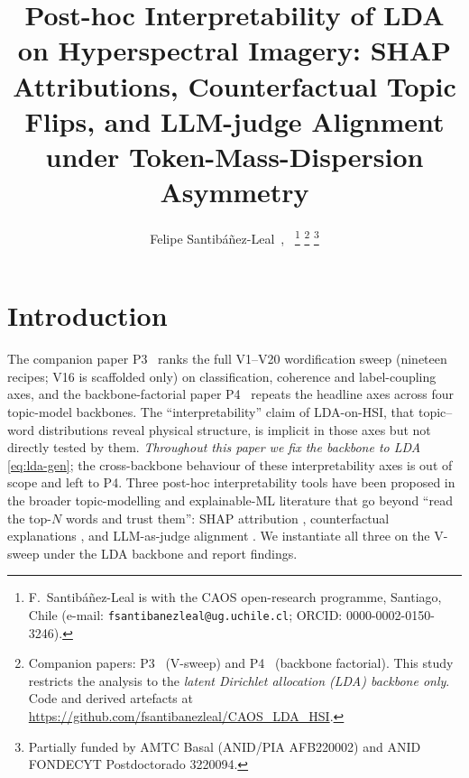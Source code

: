 \documentclass[journal,a4paper,10pt]{IEEEtran}
\title{Post-hoc Interpretability of LDA on Hyperspectral Imagery:
SHAP Attributions, Counterfactual Topic Flips, and LLM-judge
Alignment under Token-Mass-Dispersion Asymmetry}
\author{%
  Felipe Santib\'a\~nez-Leal~\orcidlink{0000-0002-0150-3246},~\IEEEmembership{Independent Researcher}%
  \thanks{F.\ Santib\'a\~nez-Leal is with the CAOS open-research
    programme, Santiago, Chile
    (e-mail: \texttt{fsantibanezleal@ug.uchile.cl};
    ORCID: 0000-0002-0150-3246).}%
  \thanks{Companion papers: P3~\cite{santibanezleal2026sweep}
    (V-sweep) and P4~\cite{santibanezleal2026factorial} (backbone
    factorial). This study restricts the analysis to the
    \emph{latent Dirichlet allocation (LDA) backbone only}. Code and
    derived artefacts at
    \url{https://github.com/fsantibanezleal/CAOS_LDA_HSI}.}%
  \thanks{Partially funded by AMTC Basal (ANID/PIA AFB220002) and
    ANID FONDECYT Postdoctorado 3220094.}%
}
\begin{document}

\maketitle
\IEEEdisplaynontitleabstractindextext
\IEEEpeerreviewmaketitle



\section{Introduction}\label{sec:intro}

The companion paper P3~\cite{santibanezleal2026sweep} ranks the full V1--V20 wordification sweep
(nineteen recipes; V16 is scaffolded only) on classification,
coherence and label-coupling axes, and the backbone-factorial paper
P4~\cite{santibanezleal2026factorial} repeats the headline axes across four topic-model backbones. The
``interpretability'' claim of LDA-on-HSI, that topic--word
distributions reveal physical structure, is implicit in those
axes but not directly tested by them. \emph{Throughout this paper we
fix the backbone to LDA} \eqref{eq:lda-gen}; the cross-backbone
behaviour of these interpretability axes is out of scope and left to
P4. Three post-hoc interpretability tools have been proposed in the
broader topic-modelling and explainable-ML literature that go beyond
``read the top-$N$ words and trust them'': SHAP attribution
\cite{lundberg2017shap}, counterfactual explanations
\cite{wachter2017counterfactual}, and LLM-as-judge alignment
\cite{stammbach2023revisiting}. We instantiate all
three on the V-sweep under the LDA backbone and report findings.
\end{document}
